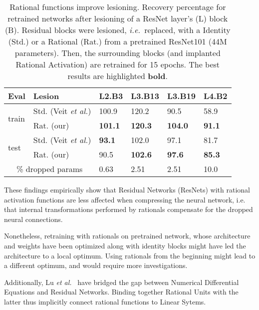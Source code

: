 \documentclass{article}
\newcommand{\ie}{\emph{i.e.}~}
\newcommand{\etal}{\emph{et al.}~}
\begin{document}
\begin{table}[t]
\centering
{\def\arraystretch{1.}\tabcolsep=3.3pt
\begin{tabular}{|l|l|l|l|l|l|}
\hline
Eval                     & Lesion   & L2.B3              & L3.B13 & L3.B19 & L4.B2 \\ \hline \hline
\multirow{2}{*}{train}  & Std. (Veit \textit{et al.})   & 100.9    & 120.2     & 90.5      & 58.9     \\ \cline{2-6} 
                        & Rat. (our)        & \textbf{101.1 }   & \textbf{120.3}     & \textbf{104.0}     & \textbf{91.1}     \\ \hline \hline
\multirow{2}{*}{test}   & Std. (Veit \textit{et al.})   & \textbf{93.1}     & 102.0     & 97.1      & 81.7     \\ \cline{2-6} 
                        & Rat. (our)        & 90.5     & \textbf{102.6}     & \textbf{97.6}      & \textbf{85.3}    \\ \hline\hline
\multicolumn{2}{|c|}{\% dropped params}     & 0.63     & 2.51     & 2.51      & 10.0     \\ \hline
                         
\end{tabular}
}
\caption{Rational functions improve lesioning. Recovery percentage for retrained networks after lesioning \cite{VeitWB16} of a ResNet layer's (L) block (B). Residual blocks were lesioned, \ie replaced, with a Identity (Std.) or a Rational (Rat.) from a pretrained ResNet101 (44M parameters). Then, the surrounding blocks (and implanted Rational Activation) are retrained for 15 epochs. The best results are highlighted \textbf{bold}.}
   \label{tab:surgery_comp}
\end{table}

These findings empirically show that Residual Networks (ResNets) with rational activation functions are less affected when compressing the neural network, i.e. that internal transformations performed by rationals compensate for the dropped neural connections.

Nonetheless, retraining with rationals on pretrained network, whose architecture and weights have been optimized along with identity blocks might have led the architecture to a local optimum. Using rationals from the beginning might lead to a different optimum, and would require more investigations. 

Additionally, Lu \etal{} have bridged the gap between Numerical Differential Equations and Residual Networks. Binding together Rational Units with the latter thus implicitly connect rational functions to Linear Sytems.
\end{document}
